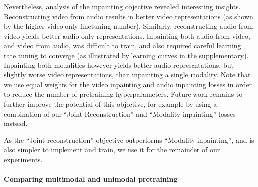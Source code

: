 \documentclass[10pt,twocolumn,letterpaper]{article}
\def \paravspace {-1\baselineskip}
\begin{document}
Nevertheless, analysis of the inpainting objective revealed interesting insights.
Reconstructing video from audio results in better video representations (as shown by the higher video-only finetuning number).
Similarly, reconstructing audio from video yields better audio-only representations. 
Inpainting both audio from video, and video from audio, was difficult to train, and also required careful learning rate tuning to converge (as illustrated by learning curves in the supplementary).
Inpainting both modalities however yields better audio representations, but slightly worse video representations, than inpainting a single modality.
Note that we use equal weights for the video inpainting and audio inpainting losses in order to reduce the number of pretraining hyperparameters.
Future work remains to further improve the potential of this objective, for example by using a combination of our ``Joint Reconstruction'' and ``Modality inpainting'' losses instead.

As the ``Joint reconstruction'' objective outperforms ``Modality inpainting'', and is also simpler to implement and train, we use it for the remainder of our experiments.





\vspace{\paravspace}
\paragraph{Comparing multimodal and unimodal pretraining}



\begin{table}[t]
	\vspace{-0.25\baselineskip}
\caption{Comparison of single-modality and audiovisual pretraining on VGGSound.
	We use a ViT-Base model with 400 epochs of pretraining.
    AudioMAE and VideoMAE refer to an MAE pretrained only on audio and video respectively.
    } 
	\vspace{-0.6\baselineskip}
\centering
{}
\vspace{-0.8\baselineskip}
\label{tab:ablation_unimodal_vs_multimodal}
\end{table}
 
\end{document}
